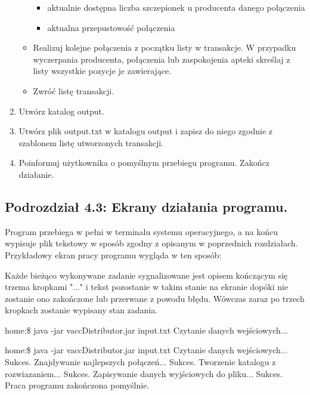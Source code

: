 \documentclass[a4paper]{article}
\begin{document}
\begin{enumerate}
\begin{itemize}
\begin{itemize}
				\item aktualnie dostępna liczba szczepionek u producenta danego połączenia
				\item aktualna przepustowość połączenia
		\end{itemize}
		\item Realizuj kolejne połączenia z początku listy w transakcje. W przypadku wyczerpania producenta, połączenia lub zaspokojenia apteki skreślaj z listy wszystkie pozycje je zawierające.
		\item Zwróć listę transakcji.
	\end{itemize}
\item Utwórz katalog output.
\item Utwórz plik output.txt w katalogu output i zapisz do niego zgodnie z szablonem listę utworzonych transakcji.
\item Poinformuj użytkownika o pomyślnym przebiegu programu. Zakończ działanie.
\end{enumerate}

\newpage
\subsection*{Podrozdział 4.3: Ekrany działania programu.}
Program przebiega w pełni w terminalu systemu operacyjnego, a na końcu wypisuje plik tekstowy w sposób zgodny z opisanym w poprzednich rozdziałach. Przykładowy ekran pracy programu wygląda w ten sposób:

Każde bieżąco wykonywane zadanie sygnalizowane jest opisem kończącym się trzema kropkami "..." i tekst pozostanie w takim stanie na ekranie dopóki nie zostanie ono zakończone lub przerwane z powodu błędu. Wówczas zaraz po trzech kropkach zostanie wypisany stan zadania.

\begin{tcolorbox}
home:\$	java -jar vaccDistributor.jar input.txt
\newline Czytanie danych wejściowych... 
\end{tcolorbox}

\begin{tcolorbox}
home:\$	java -jar vaccDistributor.jar input.txt
\newline Czytanie danych wejściowych... Sukces.
\newline Znajdywanie najlepszych połączeń... Sukces.
\newline Tworzenie katalogu z rozwiazaniem... Sukces.
\newline Zapisywanie danych wyjściowych do pliku... Sukces.
\newline 
\newline Praca programu zakończona pomyślnie.
\end{tcolorbox}
\end{document}

